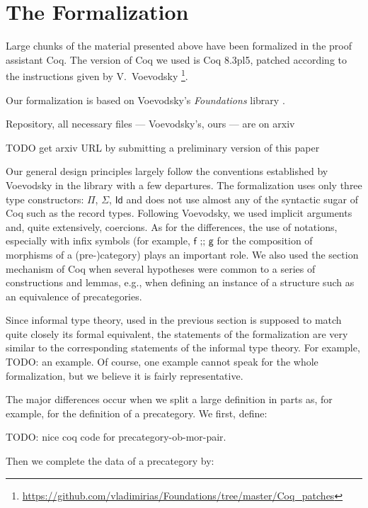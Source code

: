 
\section{The Formalization}
\label{sec:formalization}

Large chunks of the material presented above have been formalized in the proof assistant \textsf{Coq}.
The version of \textsf{Coq} we used is \textsf{Coq} 8.3pl5, patched according to the instructions given by
V.\ Voevodsky \footnote{\url{https://github.com/vladimirias/Foundations/tree/master/Coq_patches}}.

Our formalization is based on Voevodsky's \emph{Foundations} library \cite{vv_foundations}.

Repository, all necessary files --- Voevodsky's, ours --- are on arxiv

TODO get arxiv URL by submitting a preliminary version of this paper

Our general design principles largely follow the conventions established by Voevodsky in the library \cite{vv_foundations} with a few departures. 
The formalization uses only three type constructors: $\Pi$, $\Sigma$, $\textsf{Id}$ and does not use 
almost any of the syntactic sugar of \textsf{Coq} such as the record types. 
Following Voevodsky, we used implicit arguments and, quite extensively, coercions. 
As for the differences, the use of notations, especially with infix symbols (for example, $\textsf{f ;; g}$ for 
the composition of morphisms of a (pre-)category) plays an important role. We also used the section mechanism of \textsf{Coq} 
when several hypotheses were common to a series of constructions and lemmas, e.g., 
when defining an instance of a structure such as an equivalence of precategories.

Since informal type theory, used in the previous section is supposed to match quite closely its formal equivalent, 
the statements of the formalization are very similar to the corresponding statements of the informal type theory. 
For example, TODO: an example. Of course, one example cannot speak for the whole formalization, but we believe it is fairly representative.

The major differences occur when we split a large definition in parts as, for example, for the definition of a precategory. We first, define:

TODO: nice coq code for precategory-ob-mor-pair.

Then we complete the data of a precategory by:

